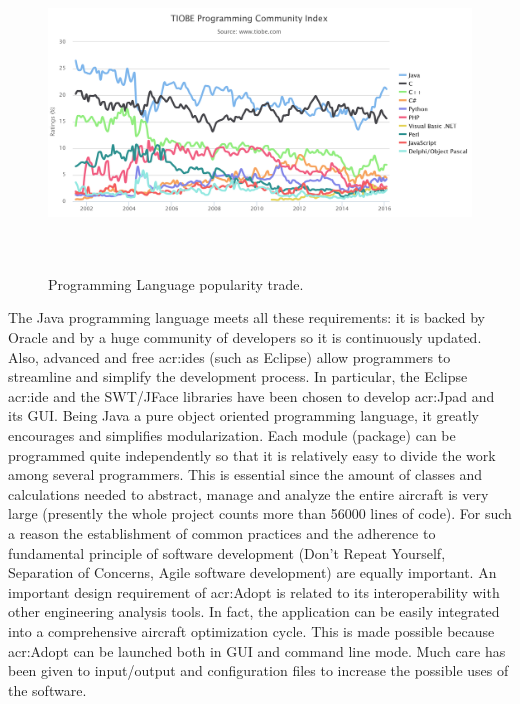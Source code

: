 \begin{figure}[H]
\centering
{\includegraphics[height=7.6cm ]{Immagini/trend.png}} 
\caption{Programming Language popularity trade.}
\label{fig:hl}
\end{figure}


The Java programming language meets all these requirements: it is backed by Oracle and by a huge community of developers so it is continuously updated. Also, advanced and free \gls{acr:ide}s (such as Eclipse) allow programmers to streamline and simplify the development process. In particular, the Eclipse \gls{acr:ide} and the SWT/JFace libraries have been chosen to develop \gls{acr:Jpad} and its \gls{GUI}.
Being Java a pure object oriented programming language, it greatly encourages and simplifies modularization. Each module (package) can be programmed quite independently so that it is relatively easy to divide the work among several programmers. This is essential since the amount of classes and calculations needed to abstract, manage and analyze the entire aircraft is very large (presently the whole project counts more than 56000 lines of code). For such a reason the establishment of common practices and the adherence to fundamental principle of software development (Don’t Repeat Yourself, Separation of Concerns, Agile software development) are equally important.
An important design requirement of \gls{acr:Adopt} is related to its interoperability with other engineering analysis tools. In fact, the application can be easily integrated into a comprehensive aircraft optimization cycle. This is made possible because \gls{acr:Adopt} can be launched both in \gls{GUI} and command line mode. Much care has been given to input/output and configuration files to increase the possible uses of the software.\cite{adoptunina}






